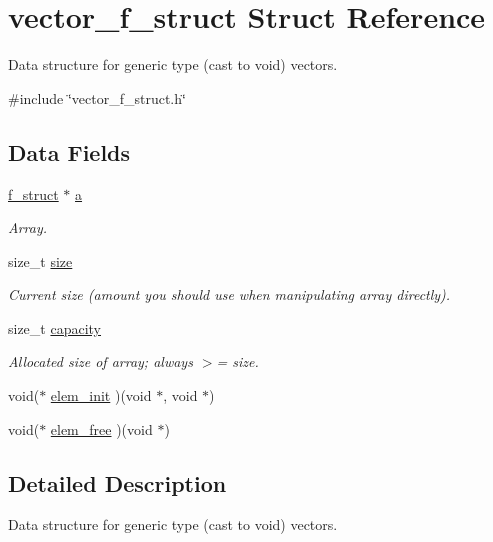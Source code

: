 \hypertarget{structvector__f__struct}{\section{vector\-\_\-f\-\_\-struct Struct Reference}
\label{structvector__f__struct}
}


Data structure for generic type (cast to void) vectors.  




{\ttfamily \#include \char`\"{}vector\-\_\-f\-\_\-struct.\-h\char`\"{}}

\subsection*{Data Fields}
\begin{DoxyCompactItemize}
\item 
\hyperlink{structf__struct}{f\-\_\-struct} $\ast$ \hyperlink{structvector__f__struct_aa08e7a5eb34ec6d49b989d92cd5c1cb0}{a}
\begin{DoxyCompactList}\small\item\em Array. \end{DoxyCompactList}\item 
size\-\_\-t \hyperlink{structvector__f__struct_ada5b7d672a0867d29ec5b134eaa77752}{size}
\begin{DoxyCompactList}\small\item\em Current size (amount you should use when manipulating array directly). \end{DoxyCompactList}\item 
size\-\_\-t \hyperlink{structvector__f__struct_a1345918800980510bc383ee375726372}{capacity}
\begin{DoxyCompactList}\small\item\em Allocated size of array; always $>$= size. \end{DoxyCompactList}\item 
void($\ast$ \hyperlink{structvector__f__struct_a6a837da0e16a7159c7c1801b4a52d406}{elem\-\_\-init} )(void $\ast$, void $\ast$)
\item 
void($\ast$ \hyperlink{structvector__f__struct_a5464311934fa85ead14cdfe90b9efdc0}{elem\-\_\-free} )(void $\ast$)
\end{DoxyCompactItemize}


\subsection{Detailed Description}
Data structure for generic type (cast to void) vectors. 

